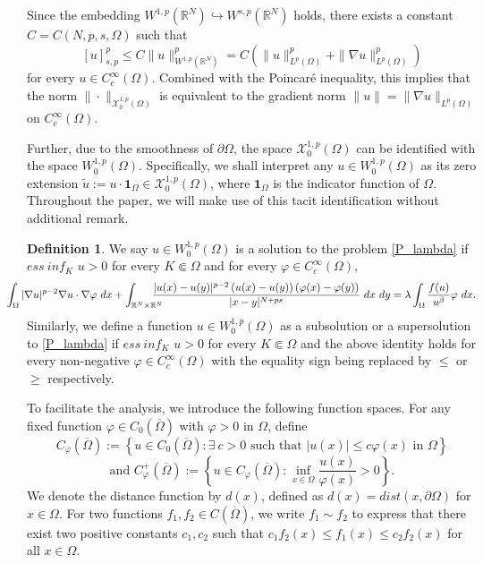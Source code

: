 \documentclass[reqno,oneside]{amsart}
\theoremstyle{definition}
\newtheorem{definition}[theorem]{Definition}
\theoremstyle{remark}
\numberwithin{equation}{section}
\newcommand{\la} {\lambda}
\newcommand{\ba}{\beta}
\newcommand{\Om} {\Omega}
\newcommand{\pa}{\partial}
\newcommand{\sr}{\mathbb{R}}
\newcommand{\na} {\nabla}
\newcommand{\wop}{W^{1,p}_0 (\Omega)}
\newcommand{\test}{C_c^{\infty} (\Om)}
\newcommand{\omc}{(\overline{\Om})}
\begin{document}
Since the embedding $W^{1,p}(\sr^N) \hookrightarrow W^{s,p}(\sr^N)$ holds, there exists a constant $C=C(N,p,s,\Om)$ such that
\[[u]^p_{s,p} \leq C \|u\|^p_{W^{1,p}(\sr^N)} = C \left(\|u\|^p_{L^p(\Om)} + \|\na u\|^p_{L^p(\Om)} \right)\]
for every $u\in\test$. Combined with the Poincar\'e inequality, this implies that the norm $\|\cdot\|_{\mathcal{X}^{1,p}_0(\Om)}$ is equivalent to the gradient norm $\|u\|= \|\na u\|_{L^p(\Om)}$ on $\test$.

Further, due to the smoothness of $\pa\Om$, the space $\mathcal{X}^{1,p}_0(\Om)$ can be identified with the space $\wop$. Specifically, we shall interpret any $u\in\wop$ as its zero extension $\tilde{u}:= u\cdot \mathbf{1}_{\Om} \in \mathcal{X}^{1,p}_0(\Om)$, where $\mathbf{1}_{\Om}$ is the indicator function of $\Om$. Throughout the paper, we will make use of this tacit identification without additional remark.

\begin{definition}
    We say $u\in\wop$ is a solution to the problem \eqref{P_lambda} if $ess\ inf_K$ $u >0$ for every $K\Subset\Om$ and for every $\varphi\in\test$,
    \begin{equation*}
        \hspace{-20pt}\int_{\Om} |\na u|^{p-2} \na u \cdot \na\varphi\ dx + \int_{\sr^N \times \sr^N} \hspace{-12pt} \frac{|u(x) - u(y)|^{p-2} \left(u(x)-u(y)\right) \left(\varphi (x) - \varphi (y)\right)}{|x-y|^{N+ps}}\ dx\ dy = \la \int_{\Om} \frac{f(u)}{u^{\ba}} \varphi\ dx.
    \end{equation*}
    Similarly, we define a function $u\in\wop$ as a subsolution or a supersolution to \eqref{P_lambda} if $ess\ inf_K$ $u >0$ for every $K\Subset\Om$ and the above identity holds for every non-negative $\varphi\in\test$ with the equality sign being replaced by $\leq$ or $\geq$ respectively.
\end{definition}

To facilitate the analysis, we introduce the following function spaces. For any fixed function $\varphi \in C_0 \omc$ with $\varphi > 0$ in $\Om$, define
\[C_{\varphi} (\overline{\Om}):= \left\{u\in C_0 \omc : \exists\ c>0 \text{ such that } |u(x)|\leq c\varphi (x) \text{ in } \Om \right\}\]
\[ \text{and } C_{\varphi}^+ (\overline{\Om}):= \left\{u\in C_{\varphi} \omc : \inf_{x\in\Om} \frac{u(x)}{\varphi (x)} >0 \right\}. \]
We denote the distance function by $d(x)$, defined as $d(x)= dist (x,\pa\Om)$ for $x\in\Om$. For two functions $f_1, f_2 \in C\omc$, we write $f_1\sim f_2$ to express that there exist two positive constants $c_1, c_2$ such that $c_1 f_2(x) \leq f_1(x) \leq c_2 f_2(x)$ for all $x\in\Om$.
\end{document}
